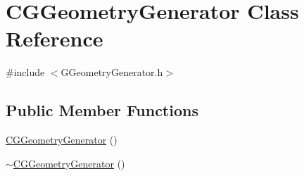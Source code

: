 \hypertarget{class_c_g_geometry_generator}{}\section{C\+G\+Geometry\+Generator Class Reference}
\label{class_c_g_geometry_generator}


{\ttfamily \#include $<$G\+Geometry\+Generator.\+h$>$}

\subsection*{Public Member Functions}
\begin{DoxyCompactItemize}
\item 
\hyperlink{class_c_g_geometry_generator_ad07b10770acef62eda2aa5ed814d2100}{C\+G\+Geometry\+Generator} ()
\item 
\hyperlink{class_c_g_geometry_generator_a44ae3e941129860808b74d35e99ae5a6}{$\sim$\+C\+G\+Geometry\+Generator} ()
\end{DoxyCompactItemize}

